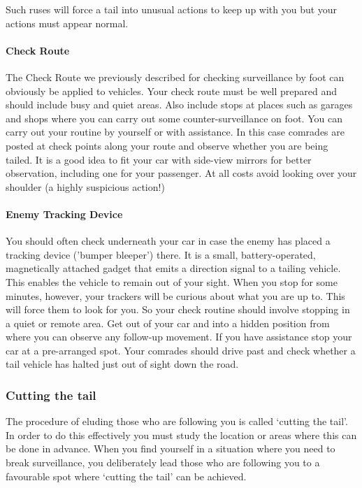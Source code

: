Such ruses will force a tail into unusual actions to keep up with you
but your actions must appear normal.

\paragraph{Check Route}

The Check Route we previously described for checking surveillance by
foot can obviously be applied to vehicles. Your check route must be well
prepared and should include busy and quiet areas. Also include stops at
places such as garages and shops where you can carry out some
counter-surveillance on foot. You can carry out your routine by yourself
or with assistance. In this case comrades are posted at check points
along your route and observe whether you are being tailed. It is a good
idea to fit your car with side-view mirrors for better observation,
including one for your passenger. At all costs avoid looking over your
shoulder (a highly suspicious action!)

\paragraph{Enemy Tracking Device}

You should often check underneath your car in case the enemy has placed
a tracking device ('bumper bleeper') there. It is a small,
battery-operated, magnetically attached gadget that emits a direction
signal to a tailing vehicle. This enables the vehicle to remain out of
your sight. When you stop for some minutes, however, your trackers will
be curious about what you are up to. This will force them to look for
you. So your check routine should involve stopping in a quiet or remote
area. Get out of your car and into a hidden position from where you can
observe any follow-up movement. If you have assistance stop your car at
a pre-arranged spot. Your comrades should drive past and check whether a
tail vehicle has halted just out of sight down the road.

\subsubsection{Cutting the tail}

The procedure of eluding those who are following you is called `cutting
the tail'. In order to do this effectively you must study the location
or areas where this can be done in advance. When you find yourself in a
situation where you need to break surveillance, you deliberately lead
those who are following you to a favourable spot where `cutting the
tail' can be achieved.

